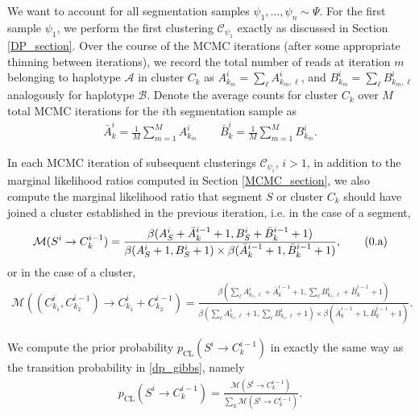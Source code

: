 \documentclass[10pt,letter]{article}
\numberwithin{equation}{section}
\newcommand{\btag}[1]{\addtocounter{equation}{1}\label{#1}\tag{\arabic{section}.\alph{equation}}}
\begin{document}
We want to account for all segmentation samples $\psi_1,\dots,\psi_n\sim\Psi$. For the first sample $\psi_1$, we perform the first clustering $\mathcal{C}_{\psi_1}$ exactly as discussed in Section \ref{DP_section}. Over the course of the MCMC iterations (after some appropriate thinning between iterations), we record the total number of reads at iteration $m$ belonging to haplotype $\mathcal A$ in cluster $C_k$ as $A^i_{k_m} = \sum_\ell A^i_{k_m,\ell}$, and $B^i_{k_m} = \sum_\ell B^i_{k_m,\ell}$ analogously for haplotype $\mathcal B$.
Denote the average counts for cluster $C_k$ over $M$ total MCMC iterations for the $i$th segmentation sample as
\begin{align*}
\bar{A}^i_k = \frac{1}{M}\sum_{m=1}^M A^i_{k_m}\qquad\bar{B}^i_k = \frac{1}{M}\sum_{m=1}^M B^i_{k_m}.
\end{align*}

In each MCMC iteration of subsequent clusterings $\mathcal{C}_{\psi_i}$, $i > 1$, in addition to the marginal likelihood ratios computed in Section \ref{MCMC_section}, we also compute the marginal likelihood ratio that segment $S$ or cluster $C_k$ should have joined a cluster established in the previous iteration, i.e. in the case of a segment,
\begin{align*}
\mathcal{M}(S^i\to C^{i-1}_k) = \frac{\beta(A^i_S + \bar A^{i-1}_k + 1,B^i_S + \bar B^{i-1}_k + 1)}{\beta(A^i_S + 1, B^i_S + 1)\times\beta(\bar A^{i-1}_k + 1, \bar B^{i-1}_k + 1)},\btag{prior_ML}
\end{align*}
or in the case of a cluster,
\begin{align*}
\mathcal{M}((C^i_{k_1}, C^{i-1}_{k_2})\to C^i_{k_1} + C^{i-1}_{k_2}) = \frac{\beta(\sum_\ell A^i_{k_1,\ell} + \bar A^{i-1}_k + 1, \sum_\ell B^i_{k_1,\ell} + \bar B^{i-1}_k + 1)}{\beta(\sum_\ell A^i_{k_1,\ell} + 1, \sum_\ell B^i_{k_1,\ell} + 1)\times\beta(\bar A^{i-1}_k + 1, \bar B^{i-1}_k + 1)}.
\end{align*}

We compute the prior probability $p_\text{CL}(S^i\to C^{i-1}_k)$ in exactly the same way as the transition probability in \eqref{dp_gibbs}, namely
\begin{align*}
p_\text{CL}(S^i\to C^{i-1}_k) = \frac{\mathcal{M}(S^i\to C^{i-1}_k)}{\sum_k \mathcal{M}(S^i\to C^{i-1}_k)}. 
\end{align*}
\end{document}
